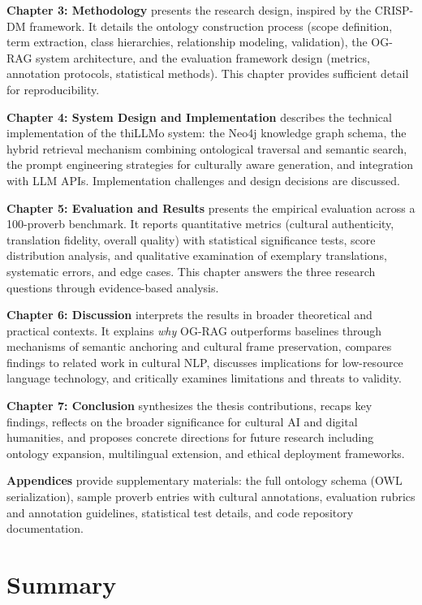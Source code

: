 \textbf{Chapter 3: Methodology} presents the research design, inspired by the CRISP-DM framework. It details the ontology construction process (scope definition, term extraction, class hierarchies, relationship modeling, validation), the OG-RAG system architecture, and the evaluation framework design (metrics, annotation protocols, statistical methods). This chapter provides sufficient detail for reproducibility.

\textbf{Chapter 4: System Design and Implementation} describes the technical implementation of the thiLLMo system: the Neo4j knowledge graph schema, the hybrid retrieval mechanism combining ontological traversal and semantic search, the prompt engineering strategies for culturally aware generation, and integration with LLM APIs. Implementation challenges and design decisions are discussed.

\textbf{Chapter 5: Evaluation and Results} presents the empirical evaluation across a 100-proverb benchmark. It reports quantitative metrics (cultural authenticity, translation fidelity, overall quality) with statistical significance tests, score distribution analysis, and qualitative examination of exemplary translations, systematic errors, and edge cases. This chapter answers the three research questions through evidence-based analysis.

\textbf{Chapter 6: Discussion} interprets the results in broader theoretical and practical contexts. It explains \emph{why} OG-RAG outperforms baselines through mechanisms of semantic anchoring and cultural frame preservation, compares findings to related work in cultural NLP, discusses implications for low-resource language technology, and critically examines limitations and threats to validity.

\textbf{Chapter 7: Conclusion} synthesizes the thesis contributions, recaps key findings, reflects on the broader significance for cultural AI and digital humanities, and proposes concrete directions for future research including ontology expansion, multilingual extension, and ethical deployment frameworks.

\textbf{Appendices} provide supplementary materials: the full ontology schema (OWL serialization), sample proverb entries with cultural annotations, evaluation rubrics and annotation guidelines, statistical test details, and code repository documentation.

\section{Summary}
\label{sec:intro_summary}

